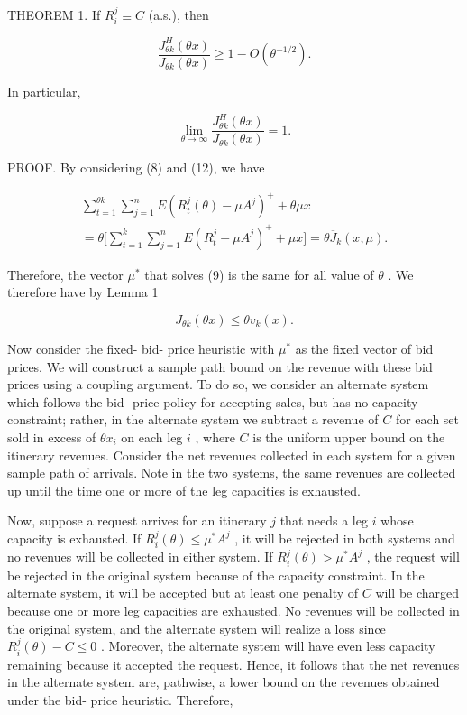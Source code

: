 THEOREM 1. If \(R_{i}^{j} \equiv C\) (a.s.), then

\[
\frac{J_{\theta k}^{H}(\theta x)}{J_{\theta k}(\theta x)} \geq 1 - O(\theta^{-1 / 2}).
\]

In particular,

\[
\lim_{\theta \to \infty} \frac{J_{\theta k}^{H}(\theta x)}{J_{\theta k}(\theta x)} = 1.
\]

PROOF. By considering (8) and (12), we have

\[
\begin{array}{l}{{\sum_{t=1}^{\theta k}\sum_{j=1}^{n}E(R_{t}^{j}(\theta)-\mu A^{j})^{+}+\theta\mu x}}\\ {{=\theta\bigg[\sum_{t=1}^{k}\sum_{j=1}^{n}E(R_{t}^{j}-\mu A^{j})^{+}+\mu x\bigg]=\theta\overline{{J}}_{k}(x,\mu).}}\end{array} \tag{14}
\]

Therefore, the vector \(\mu^{*}\) that solves (9) is the same for all
value of \(\theta\) . We therefore have by Lemma 1

\[
J_{\theta k}(\theta x) \leq \theta v_{k}(x). \tag{13}
\]

Now consider the fixed- bid- price heuristic with \(\mu^{*}\) as the
fixed vector of bid prices. We will construct a sample path bound on the
revenue with these bid prices using a coupling argument. To do so, we
consider an alternate system which follows the bid- price policy for
accepting sales, but has no capacity constraint; rather, in the
alternate system we subtract a revenue of \(C\) for each set sold in
excess of \(\theta x_{i}\) on each leg \(i\) , where \(C\) is the
uniform upper bound on the itinerary revenues. Consider the net revenues
collected in each system for a given sample path of arrivals. Note in
the two systems, the same revenues are collected up until the time one
or more of the leg capacities is exhausted.

Now, suppose a request arrives for an itinerary \(j\) that needs a leg
\(i\) whose capacity is exhausted. If
\(R_{i}^{j}(\theta) \leq \mu^{*} A^{j}\) , it will be rejected in both
systems and no revenues will be collected in either system. If
\(R_{i}^{j}(\theta) > \mu^{*} A^{j}\) , the request will be rejected in
the original system because of the capacity constraint. In the alternate
system, it will be accepted but at least one penalty of \(C\) will be
charged because one or more leg capacities are exhausted. No revenues
will be collected in the original system, and the alternate system will
realize a loss since \(R_{i}^{j}(\theta) - C \leq 0\) . Moreover, the
alternate system will have even less capacity remaining because it
accepted the request. Hence, it follows that the net revenues in the
alternate system are, pathwise, a lower bound on the revenues obtained
under the bid- price heuristic. Therefore,

